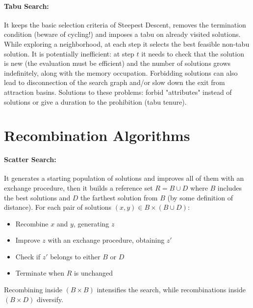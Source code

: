 \documentclass{article}
\begin{document}
	\paragraph{Tabu Search:} It keeps the basic selection criteria of Steepest Descent, removes the termination condition (beware of cycling!) and imposes a tabu on already visited solutions. While exploring a neighborhood, at each step it selects the best feasible non-tabu solution. It is potentially inefficient: at step $t$ it needs to check that the solution is new (the evaluation must be efficient) and the number of solutions grows indefinitely, along with the memory occupation. Forbidding solutions can also lead to disconnection of the search graph and/or slow down the exit from attraction basins. Solutions to these problems: forbid "attributes" instead of solutions or give a duration to the prohibition (tabu tenure).\\
	
	\section*{Recombination Algorithms}
	
	\paragraph{Scatter Search:} It generates a starting population of solutions and improves all of them with an exchange procedure, then it builds a reference set $R = B \cup D$ where $B$ includes the best solutions and $D$ the farthest solution from $B$ (by some definition of distance). For each pair of solutions $(x,y) \in B \times (B \cup D)$: 
	\begin{itemize}
		\item Recombine $x$ and $y$, generating $z$
		\item Improve $z$ with an exchange procedure, obtaining $z'$
		\item Check if $z'$ belongs to either $B$ or $D$
		\item Terminate when $R$ is unchanged
	\end{itemize}
	Recombining inside $(B \times B)$ intensifies the search, while recombinations inside $(B \times D)$ diversify.\\
	
\end{document}
